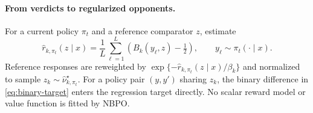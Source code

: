 \documentclass{article}
\theoremstyle{remark}
\theoremstyle{plain}
\newcommand{\NBPO}{\textsc{NBPO}}
\begin{document}
\paragraph{From verdicts to regularized opponents.}
For a current policy $\pi_t$ and a reference comparator $z$, estimate
\[
\widehat r_{k,\pi_t}(z\mid x)
=\frac1L\sum_{\ell=1}^L
\left(B_k(y_\ell,z)-\tfrac12\right),
\qquad y_\ell\sim\pi_t(\cdot\mid x).
\]
Reference responses are reweighted by
$\exp\{-\widehat r_{k,\pi_t}(z\mid x)/\beta_k\}$ and normalized to sample $z_k\sim\widehat\nu^\star_{k,\pi_t}$. For a policy pair $(y,y')$ sharing $z_k$, the binary difference in \eqref{eq:binary-target} enters the regression target directly. No scalar reward model or value function is fitted by \NBPO{}.
\end{document}

